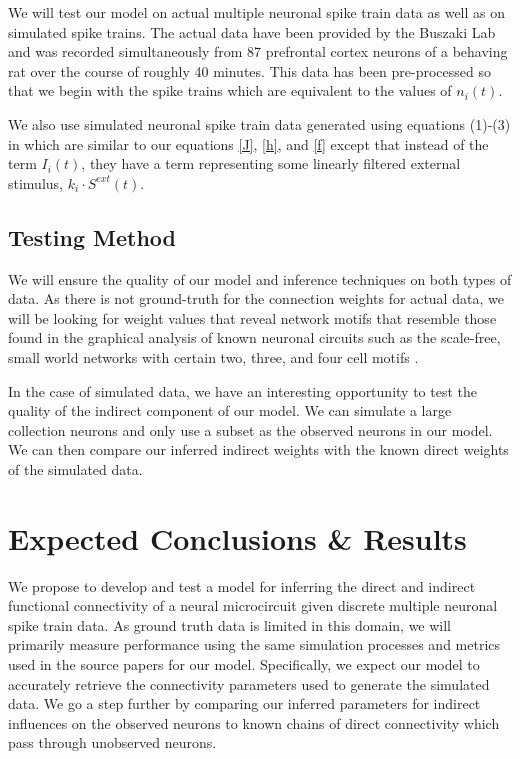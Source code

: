 \documentclass{article}
\begin{document}
We will test our model on actual multiple neuronal spike train data as well as on simulated spike trains. The actual data have been provided by the Buszaki Lab and was recorded simultaneously from 87 prefrontal cortex neurons of a behaving rat over the course of roughly 40 minutes. This data has been pre-processed so that we begin with the spike trains which are equivalent to the values of $n_i(t)$.

We also use simulated neuronal spike train data generated using equations (1)-(3) in \citep{mishchencko2011} which are similar to our equations \eqref{J}, \eqref{h}, and \eqref{f} except that instead of the term $I_i(t)$, they have a term representing some linearly filtered external stimulus, $k_i \cdot S^{ext}(t)$.

\subsection{Testing Method}

We will ensure the quality of our model and inference techniques on both types of data. As there is not ground-truth for the connection weights for actual data, we will be looking for weight values that reveal network motifs that resemble those found in the graphical analysis of known neuronal circuits such as the scale-free, small world networks with certain two, three, and four cell motifs \citep{song2005,perin2011}.

In the case of simulated data, we have an interesting opportunity to test the quality of the indirect component of our model. We can simulate a large collection neurons and only use a subset as the observed neurons in our model. We can then compare our inferred indirect weights with the known direct weights of the simulated data.

\section{Expected Conclusions \& Results}
We propose to develop and test a model for inferring the direct and indirect functional connectivity of a neural microcircuit given discrete multiple neuronal spike train data. As ground truth data is limited in this domain, we will primarily measure performance using the same simulation processes and metrics used in the source papers for our model.  Specifically, we expect our model to accurately retrieve the connectivity parameters used to generate the simulated data. We go a step further by comparing our inferred parameters for indirect influences on the observed neurons to known chains of direct connectivity which pass through unobserved neurons.
\end{document}
